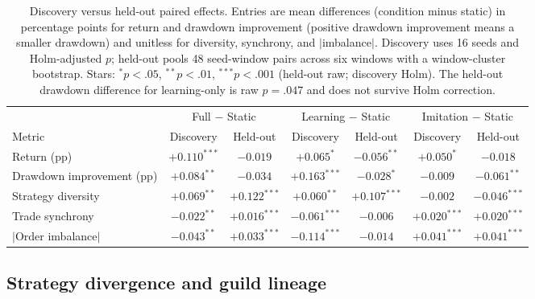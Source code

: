 \documentclass[11pt]{article}
\begin{document}
\begin{table}[t]
  \centering
  \small
  \setlength{\tabcolsep}{3pt}
  \caption{Discovery versus held-out paired effects. Entries are mean differences
  (condition minus static) in percentage points for return and drawdown
  improvement (positive drawdown improvement means a smaller drawdown) and
  unitless for diversity, synchrony, and $|$imbalance$|$. Discovery uses 16
  seeds and Holm-adjusted $p$; held-out pools 48 seed-window pairs across six
  windows with a window-cluster bootstrap. Stars: $^{*}p<.05$, $^{**}p<.01$,
  $^{***}p<.001$ (held-out raw; discovery Holm). The held-out drawdown difference
  for learning-only is raw $p=.047$ and does not survive Holm correction.}
  \label{tab:replication}
  \begin{tabular}{lcccccc}
    \toprule
    & \multicolumn{2}{c}{Full $-$ Static} & \multicolumn{2}{c}{Learning $-$ Static} & \multicolumn{2}{c}{Imitation $-$ Static}\\
    \cmidrule(lr){2-3}\cmidrule(lr){4-5}\cmidrule(lr){6-7}
    Metric & Discovery & Held-out & Discovery & Held-out & Discovery & Held-out\\
    \midrule
    Return (pp) & $+0.110^{***}$ & $-0.019$ & $+0.065^{*}$ & $-0.056^{**}$ & $+0.050^{*}$ & $-0.018$\\
    Drawdown improvement (pp) & $+0.084^{**}$ & $-0.034$ & $+0.163^{***}$ & $-0.028^{*}$ & $-0.009$ & $-0.061^{**}$\\
    Strategy diversity & $+0.069^{**}$ & $+0.122^{***}$ & $+0.060^{**}$ & $+0.107^{***}$ & $-0.002$ & $-0.046^{***}$\\
    Trade synchrony & $-0.022^{**}$ & $+0.016^{***}$ & $-0.061^{***}$ & $-0.006$ & $+0.020^{***}$ & $+0.020^{***}$\\
    $|$Order imbalance$|$ & $-0.043^{**}$ & $+0.033^{***}$ & $-0.114^{***}$ & $-0.014$ & $+0.041^{***}$ & $+0.041^{***}$\\
    \bottomrule
  \end{tabular}
\end{table}

\subsection{Strategy divergence and guild lineage}
\end{document}
